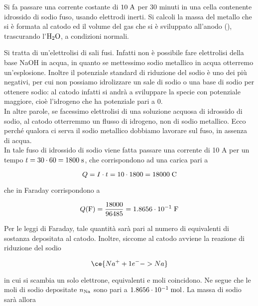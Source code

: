\begin{esercizio}
    Si fa passare una corrente costante di $10 \; \rm A$ per 30 minuti in una cella contenente idrossido di sodio fuso, usando elettrodi inerti. Si calcoli la massa del metallo che si è formata al catodo ed il volume del gas che si è sviluppato all'anodo (), trascurando l'$\rm H_2O$, a condizioni normali.
\end{esercizio}
\begin{soluzione}
    Si tratta di un'elettrolisi di sali fusi. Infatti non è possibile fare elettrolisi della base NaOH in acqua, in quanto se mettessimo sodio metallico in acqua otterremo un'esplosione. Inoltre il potenziale standard di riduzione del sodio è uno dei più negativi, per cui non possiamo idrolizzare un sale di sodio o una base di sodio per ottenere sodio: al catodo infatti si andrà a sviluppare la specie con potenziale maggiore, cioè l'idrogeno che ha potenziale pari a 0.\\
    In altre parole, se facessimo elettrolisi di una soluzione acquosa di idrossido di sodio, al catodo otterremmo un flusso di idrogeno, non di sodio metallico. Ecco perché qualora ci serva il sodio metallico dobbiamo lavorare sul fuso, in assenza di acqua.\\
    In tale fuso di idrossido di sodio viene fatta passare una corrente di 10 A per un tempo $t=30 \cdot 60=1800 \; \rm s$, che corrispondono ad una carica pari a

\begin{equation*}
    Q=I \cdot t=10 \cdot 1800=18000 \; \rm C
\end{equation*}

che in Faraday corrispondono a

\begin{equation*}
    Q(\rm F)=\frac{18000}{96485}=1.8656 \cdot 10^{-1} \; F
\end{equation*}

Per le leggi di Faraday, tale quantità sarà pari al numero di equivalenti di sostanza depositata al catodo. Inoltre, siccome al catodo avviene la reazione di riduzione del sodio

\begin{equation*}
    \ce{Na^+ + 1e^- -> Na}
\end{equation*}

in cui si scambia un solo elettrone, equivalenti e moli coincidono. Ne segue che le moli di sodio depositate $n_{\rm Na}$ sono pari a $1.8656 \cdot 10^{-1} \; \rm mol$. La massa di sodio sarà allora


\end{soluzione}

